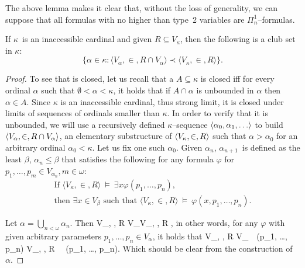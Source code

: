 The above lemma makes it clear that, without the loss of generality, we can suppose that all formulas with no higher than type~2 variables are $\Pi^1_n$–formulas.

\begin{lemma}\label{lemma:inaccessible_clubset}
If $\kappa$ is an inaccessible cardinal and given $R \subseteq V_\kappa$, then the following is a club set in $\kappa$:
\begin{equation}
\{\alpha \in \kappa : \langle V_\alpha, \in, R \cap V_\alpha \rangle \prec \langle V_\kappa, \in, R \rangle \}\label{eq:inacc_lemma_set}\mbox{.}
\end{equation}
\end{lemma}

\begin{proof}
To see that  is closed, let us recall that a $A \subseteq \kappa$ is closed iff for every ordinal $\alpha$ such that $\emptyset < \alpha < \kappa$, it holds that if $A \cap \alpha$ is unbounded in $\alpha$ then $\alpha \in A$. Since $\kappa$ is an inaccessible cardinal, thus strong limit, it is closed under limits of sequences of ordinals smaller than $\kappa$.
In order to verify that it is unbounded, we will use a recursively defined $\kappa$–sequence $\langle \alpha_0, \alpha_1, \ldots \rangle$
to build $\langle V_\alpha, \in, R \cap V_\alpha \rangle$, an elementary substructure of $\langle V_\kappa, \in, R \rangle$ such that $\alpha > \alpha_0$ for an arbitrary ordinal $\alpha_0 < \kappa$.
Let us fix one such $\alpha_0$. Given $\alpha_n$, $\alpha_{n+1}$ is defined as the least $\beta$, $\alpha_n \leq \beta$ that satisfies 
the following for any formula $\varphi$ for $p_1, \ldots, p_m \in V_{\alpha_{n}}, m \in \omega$:
\begin{equation}
\begin{gathered}
\mbox{If }\langle V_\kappa, \in, R \rangle~\models~\exists x \varphi(p_1, \ldots, p_n)\mbox{,}\\
\mbox{then }\exists x \in V_\beta \mbox{ such that }\langle V_\kappa, \in, R \rangle~\models~\varphi(x, p_1, \ldots, p_n)\mbox{.}
\end{gathered}
\end{equation}

Let $\alpha = \bigcup_{n < \omega} \alpha_n$. Then 
\beq
\langle V_\alpha, \in, R \cap V_\alpha \rangle \prec \langle V_\kappa, \in, R \rangle\mbox{,}
\eeq
in other words, for any $\varphi$ with given arbitrary parameters $p_1, \ldots, p_n \in V_\alpha$, it holds that
\beq
\langle V_\alpha, \in, R \cap V_\alpha \rangle~\models~\varphi(p_1, \ldots, p_n) \iff \langle V_\kappa, \in, R \rangle~\models~\varphi(p_1, \ldots, p_n)\mbox{.}
\eeq
Which should be clear from the construction of $\alpha$.
\end{proof}

